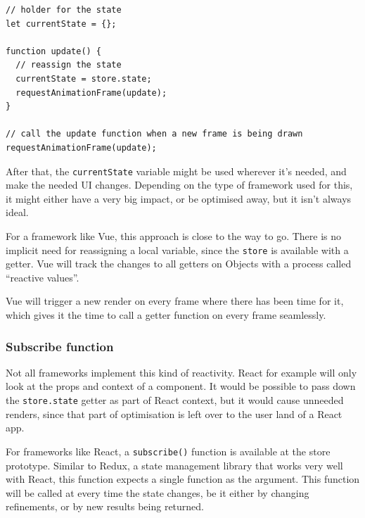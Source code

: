 \begin{minipage}{\linewidth}
\begin{lstlisting}[caption={Naive way to find out about changed state},label={lst:is-core-naive-subscribe}]
// holder for the state
let currentState = {};

function update() {
  // reassign the state
  currentState = store.state;
  requestAnimationFrame(update);
}

// call the update function when a new frame is being drawn
requestAnimationFrame(update);
\end{lstlisting}
\end{minipage}

After that, the {\tt currentState} variable might be used wherever it's needed, and make the needed UI changes. Depending on the type of framework used for this, it might either have a very big impact, or be optimised away, but it isn't always ideal.

For a framework like Vue\cite{vue-reactivity}, this approach is close to the way to go. There is no implicit need for reassigning a local variable, since the {\tt store} is available with a getter. Vue will track the changes to all getters on Objects with a process called ``reactive values''.

Vue will trigger a new render on every frame where there has been time for it, which gives it the time to call a getter function on every frame seamlessly. 

\subsubsection{Subscribe function}
\label{ssub:subscribe_function}

Not all frameworks implement this kind of reactivity. React for example will only look at the props and context of a component. It would be possible to pass down the {\tt store.state} getter as part of React context, but it would cause unneeded renders, since that part of optimisation is left over to the user land of a React app. 

For frameworks like React, a {\tt subscribe()} function is available at the store prototype. Similar to Redux\cite{redux-glossary-store}, a state management library that works very well with React, this function expects a single function as the argument. This function will be called at every time the state changes, be it either by changing refinements, or by new results being returned.

